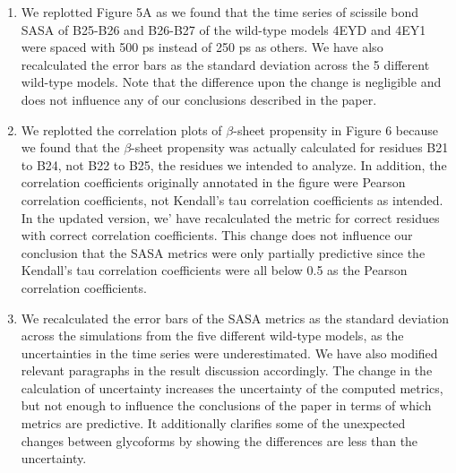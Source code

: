 \documentclass[9pt]{elife}
\begin{document}
\begin{enumerate}[label={(\arabic*)}]
\item We replotted Figure 5A as we found that the time series of scissile bond SASA of B25-B26 and B26-B27 of the wild-type models 4EYD and 4EY1 were spaced with 500 ps instead of 250 ps as others. We have also recalculated the error bars as the standard deviation across the 5 different wild-type models. Note that the difference upon the change is negligible and does not influence any of our conclusions described in the paper.
\item We replotted the correlation plots of $\beta$-sheet propensity in Figure 6 because we found that the $\beta$-sheet propensity was actually calculated for residues B21 to B24, not B22 to B25, the residues we intended to analyze. In addition, the correlation coefficients originally annotated in the figure were Pearson correlation coefficients, not Kendall's tau correlation coefficients as intended. In the updated version, we' have recalculated the metric for correct residues with correct correlation coefficients. This change does not influence our conclusion that the SASA metrics were only partially predictive since the Kendall's tau correlation coefficients were all below 0.5 as the Pearson correlation coefficients. 
\item We recalculated the error bars of the SASA metrics as the standard deviation across the simulations from the five different wild-type models, as the uncertainties in the time series were underestimated. We have also modified relevant paragraphs in the result discussion accordingly. The change in the calculation of uncertainty increases the uncertainty of the computed metrics, but not enough to influence the conclusions of the paper in terms of which metrics are predictive. It additionally clarifies some of the unexpected changes between glycoforms by showing the differences are less than the uncertainty. 

\end{enumerate}
\end{document}
